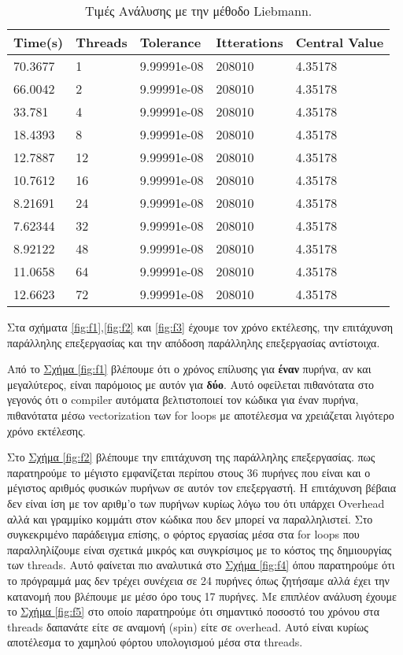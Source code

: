 \documentclass[11pt]{scrartcl} %
\begin{document}
\begin{table}[h]
\begin{tabular}{lllll}
Time(s) & Threads & Tolerance & Itterations & Central Value\\
\hline
\hline
70.3677 & 1 & 9.99991e-08 & 208010 & 4.35178 \\
66.0042 & 2 & 9.99991e-08 & 208010 & 4.35178 \\
33.781 & 4 & 9.99991e-08 & 208010 & 4.35178 \\
18.4393 & 8 & 9.99991e-08 & 208010 & 4.35178 \\
12.7887 & 12 & 9.99991e-08 & 208010 & 4.35178 \\
10.7612 & 16 & 9.99991e-08 & 208010 & 4.35178 \\
8.21691 & 24 & 9.99991e-08 & 208010 & 4.35178 \\
7.62344 & 32 & 9.99991e-08 & 208010 & 4.35178 \\
8.92122 & 48 & 9.99991e-08 & 208010 & 4.35178 \\
11.0658 & 64 & 9.99991e-08 & 208010 & 4.35178 \\
12.6623 & 72 & 9.99991e-08 & 208010 & 4.35178
\end{tabular}
\caption{Τιμές Ανάλυσης με την μέθοδο Liebmann.}
\label{table:t2}
\end{table}


Στα σχήματα \hyperref[fig:f1]{\ref{fig:f1}},\hyperref[fig:f2]{\ref{fig:f2}} και \hyperref[fig:f3]{\ref{fig:f3}} έχουμε τον χρόνο εκτέλεσης, την επιτάχυνση παράλληλης επεξεργασίας και την απόδοση παράλληλης επεξεργασίας αντίστοιχα.

Από το \hyperref[fig:f1]{Σχήμα \ref*{fig:f1}} βλέπουμε ότι ο χρόνος επίλυσης για \textbf{έναν} πυρήνα, αν και μεγαλύτερος, είναι παρόμοιος με αυτόν για \textbf{δύο}. Αυτό οφείλεται πιθανότατα στο γεγονός ότι ο compiler αυτόματα βελτιστοποιεί τον κώδικα για έναν πυρήνα, πιθανότατα μέσω vectorization των for loops με αποτέλεσμα να χρειάζεται λιγότερο χρόνο εκτέλεσης. 

Στο \hyperref[fig:f2]{Σχήμα \ref*{fig:f2}} βλέπουμε την επιτάχυνση της παράλληλης επεξεργασίας. πως παρατηρούμε το μέγιστο εμφανίζεται περίπου στους 36 πυρήνες που είναι και ο μέγιστος αριθμός φυσικών πυρήνων σε αυτόν τον επεξεργαστή. Η επιτάχυνση βέβαια δεν είναι ίση με τον αριθμ'ο των πυρήνων κυρίως λόγω του ότι υπάρχει Overhead αλλά και γραμμίκο κομμάτι στον κώδικα που δεν μπορεί να παραλληλιστεί. Στο συγκεκριμένο παράδειγμα επίσης, ο φόρτος εργασίας μέσα στα for loops που παραλληλίζουμε είναι σχετικά μικρός και συγκρίσιμος με το κόστος της δημιουργίας των threads. Αυτό φαίνεται πιο αναλυτικά στο \hyperref[fig:f4]{Σχήμα \ref*{fig:f4}} όπου παρατηρούμε ότι το πρόγραμμά μας δεν τρέχει συνέχεια σε 24 πυρήνες όπως ζητήσαμε αλλά έχει την κατανομή που βλέπουμε με μέσο όρο τους 17 πυρήνες. Με επιπλέον ανάλυση έχουμε το \hyperref[fig:f5]{Σχήμα \ref*{fig:f5}} στο οποίο παρατηρούμε ότι σημαντικό ποσοστό του χρόνου στα threads δαπανάτε είτε σε αναμονή (spin) είτε σε overhead. Αυτό είναι κυρίως αποτέλεσμα το χαμηλού φόρτου υπολογισμού μέσα στα threads.
\end{document}
